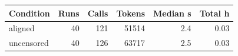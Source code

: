 \begin{tabular}{lrrrrr}
\toprule
Condition & Runs & Calls & Tokens & Median s & Total h \\
\midrule
aligned & 40 & 121 & 51514 & 2.4 & 0.03 \\
uncensored & 40 & 126 & 63717 & 2.5 & 0.03 \\
\bottomrule
\end{tabular}
